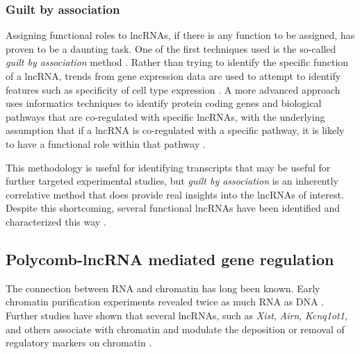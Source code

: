 \subsubsection{Guilt by association}
Assigning functional roles to lncRNAs, if there is any function to be assigned, has proven to be a daunting task. One of the first techniques used is the so-called \emph{guilt by association} method \cite{Guttman2009ChromatinMammals,Rinn2012GenomeRNAs}. Rather than trying to identify the specific function of a lncRNA, trends from gene expression data are used to attempt to identify features such as specificity of cell type expression \cite{Mercer2008SpecificBrain,Perron2017InExpression,Lefever2017DecodeRNA-Guilt-by-association}. A more advanced approach uses informatics techniques to identify protein coding genes and biological pathways that are co-regulated with specific lncRNAs, with the underlying assumption that if a lncRNA is co-regulated with a specific pathway, it is likely to have a functional role within that pathway \cite{Thiel2019IdentifyingAnalysis}. 

This methodology is useful for identifying transcripts that may be useful for further targeted experimental studies, but \emph{guilt by association} is an inherently correlative method that does provide real insights into the lncRNAs of interest. Despite this shortcoming, several functional lncRNAs have been identified and characterized this way \cite{Gupta2010LongMetastasis, Broadbent2011ALncRNAs}. 


\subsection{Polycomb-lncRNA mediated gene regulation}

The connection between RNA and chromatin has long been known. Early chromatin purification experiments revealed twice as much RNA as DNA \cite{Paul1975Chromatin-associatedEuchromatin}. Further studies have shown that several lncRNAs, such as \emph{Xist}, \emph{Airn}, \emph{Kcnq1ot1}, and others associate with chromatin and modulate the deposition or removal of regulatory markers on chromatin \cite{Schertzer2019LncRNA-InducedDNA,Pandey2008Kcnq1ot1Regulation,Sleutels2002TheGenes}. 

